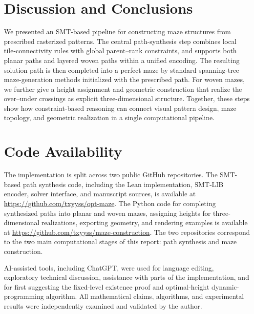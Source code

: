 \documentclass[acmsmall,screen,nonacm]{acmart}
\begin{document}
\section{Discussion and Conclusions}

We presented an SMT-based pipeline for constructing maze structures
from prescribed rasterized patterns. The central path-synthesis step
combines local tile-connectivity rules with global parent--rank
constraints, and supports both planar paths and layered woven paths
within a unified encoding. The resulting solution path is then
completed into a perfect maze by standard spanning-tree
maze-generation methods initialized with the prescribed path. For
woven mazes, we further give a height assignment and geometric
construction that realize the over--under crossings as explicit
three-dimensional structure.  Together, these steps show how
constraint-based reasoning can connect visual pattern design, maze
topology, and geometric realization in a single computational
pipeline.

\section*{Code Availability}

The implementation is split across two public GitHub repositories. The
SMT-based path synthesis code, including the Lean implementation,
SMT-LIB encoder, solver interface, and manuscript sources, is
available at \url{https://github.com/txyyss/opt-maze}. The Python code
for completing synthesized paths into planar and woven mazes,
assigning heights for three-dimensional realizations, exporting
geometry, and rendering examples is available at
\url{https://github.com/txyyss/maze-construction}. The two
repositories correspond to the two main computational stages of this
report: path synthesis and maze construction.

\begin{acks}
AI-assisted tools, including ChatGPT, were used for language editing,
exploratory technical discussion, assistance with parts of the
implementation, and for first suggesting the fixed-level existence
proof and optimal-height dynamic-programming algorithm.
All mathematical claims, algorithms, and experimental results were
independently examined and validated by the author.
\end{acks}




\end{document}
